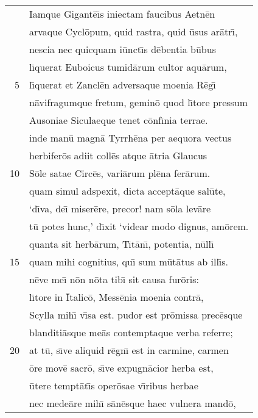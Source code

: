 \documentclass[paper=6in:9in,pagesize=pdftex,
               headinclude=on,footinclude=on,12pt]{scrbook}
\begin{document}

\begin{longtable}[p]{ r l }
 & \indent Iamque Gigant\=e\={\i}s iniectam faucibus Aetn\=en\\ 
 & arvaque Cycl\=opum, quid rastra, quid \=usus ar\=atr\={\i},\\ 
 & nescia nec quicquam i\=unct\={\i}s d\=ebentia b\=ubus\\ 
 & l\={\i}querat Euboicus tumid\=arum cultor aqu\=arum,\\ 
5 & l\={\i}querat et Zancl\=en adversaque moenia R\=eg\={\i}\\ 
 & n\=avifragumque fretum, gemin\=o quod l\={\i}tore pressum\\ 
 & Ausoniae Siculaeque tenet c\=onf\={\i}nia terrae.\\ 
 & inde man\=u magn\=a Tyrrh\=ena per aequora vectus\\ 
 & herbifer\=os adiit coll\=es atque \=atria Glaucus\\ 
10 & S\=ole satae Circ\=es, vari\=arum pl\=ena fer\=arum.\\ 
 & quam simul adspexit, dicta accept\=aque sal\=ute,\\ 
 & `d\={\i}va, de\={\i} miser\=ere, precor! nam s\=ola lev\=are\\ 
 & t\=u potes hunc,' d\={\i}xit `videar modo dignus, am\=orem.\\ 
 & quanta sit herb\=arum, T\={\i}t\=an\={\i}, potentia, n\=ull\={\i}\\ 
15 & quam mihi cognitius, qu\={\i} sum m\=ut\=atus ab ill\={\i}s.\\ 
 & n\=eve me\={\i} n\=on n\=ota tib\={\i} sit causa fur\=oris:\\ 
 & l\={\i}tore in \=Italic\=o, Mess\=enia moenia contr\=a,\\ 
 & Scylla mih\={\i} v\={\i}sa est. pudor est pr\=omissa prec\=esque\\ 
 & blanditi\=asque me\=as contemptaque verba referre;\\ 
20 & at t\=u, s\={\i}ve aliquid r\=egn\={\i} est in carmine, carmen\\ 
 & \=ore mov\=e sacr\=o, s\={\i}ve expugn\=acior herba est,\\ 
 & \=utere tempt\=at\={\i}s oper\=osae v\={\i}ribus herbae\\ 
 & nec mede\=are mih\={\i} s\=an\=esque haec vulnera mand\=o,\\ 

\end{longtable}
\end{document}
